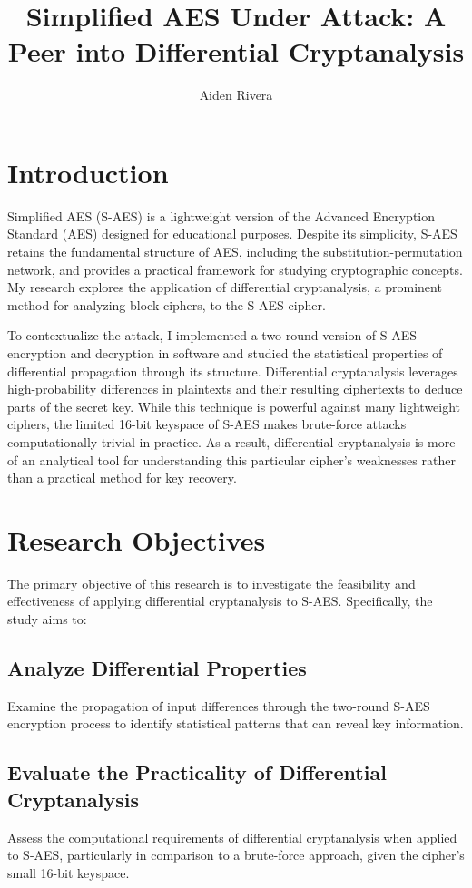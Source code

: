 \documentclass{article}
\author[1]{Aiden Rivera}
\title{Simplified AES Under Attack: A Peer into Differential Cryptanalysis}
\begin{document}
\maketitle
\tableofcontents
\newpage

\section{Introduction}
Simplified AES (S-AES) is a lightweight version of the Advanced Encryption Standard (AES) designed for educational purposes. Despite its simplicity, S-AES retains the fundamental structure of AES, including the substitution-permutation network, and provides a practical framework for studying cryptographic concepts. My research explores the application of differential cryptanalysis, a prominent method for analyzing block ciphers, to the S-AES cipher.

To contextualize the attack, I implemented a two-round version of S-AES encryption and decryption in software and studied the statistical properties of differential propagation through its structure. Differential cryptanalysis leverages high-probability differences in plaintexts and their resulting ciphertexts to deduce parts of the secret key. While this technique is powerful against many lightweight ciphers, the limited 16-bit keyspace of S-AES makes brute-force attacks computationally trivial in practice. As a result, differential cryptanalysis is more of an analytical tool for understanding this particular cipher's weaknesses rather than a practical method for key recovery.

\section{Research Objectives}
The primary objective of this research is to investigate the feasibility and effectiveness of applying differential cryptanalysis to S-AES. Specifically, the study aims to:

\subsection{Analyze Differential Properties}
Examine the propagation of input differences through the two-round S-AES encryption process to identify statistical patterns that can reveal key information.

\subsection{Evaluate the Practicality of Differential Cryptanalysis}    
Assess the computational requirements of differential cryptanalysis when applied to S-AES, particularly in comparison to a brute-force approach, given the cipher’s small 16-bit keyspace.
\end{document}
